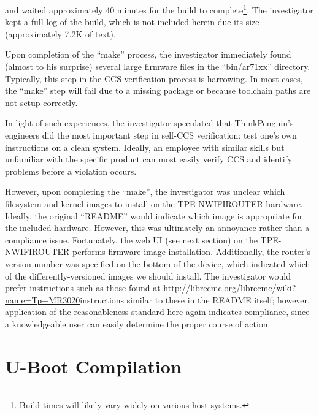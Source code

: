 and waited approximately 40 minutes for the build to complete\footnote{Build
  times will likely vary widely on various host systems.}.  The investigator
kept a
\href{https://gitorious.org/copyleft-org/tutorial/source/master:enforcement-case-studies_log-output/thinkpenguin_librecmc-complete.log}{full
  log of the build}, which is not included herein due its size (approximately
7.2K of text).
\label{thinkpenguin-main-build}

Upon completion of the ``make'' process, the investigator immediately found
(almost to his surprise) several large firmware files in the ``bin/ar71xx''
directory.  Typically, this step in the CCS verification process is
harrowing.  In most cases, the ``make'' step will fail due to a missing
package or because toolchain paths are not setup correctly.

In light of such experiences, the investigator speculated that ThinkPenguin's engineers did
the most important step in self-CCS verification: test one's own instructions
on a clean system.  Ideally, an employee with similar skills but
unfamiliar with the specific product can most easily verify CCS  and identify
problems before a violation occurs.


However, upon completing the ``make'', the investigator was unclear which
filesystem and kernel images to install on the TPE-NWIFIROUTER hardware.
Ideally, the original ``README'' would indicate which image is appropriate
for the included hardware.  However, this was ultimately an annoyance rather
than a compliance issue.  Fortunately,
the web UI (see next section) on the TPE-NWIFIROUTER performs firmware image
installation.  Additionally, the router's version number was specified on the
bottom of the device, which indicated which of the differently-versioned images
we should install.  The investigator would prefer instructions such as
those found at
\url{http://librecmc.org/librecmc/wiki?name=Tp+MR3020}{instructions similar
  to these} in the README itself; however, application of the reasonableness
standard here again indicates compliance, since a knowledgeable user can easily
determine the proper course of action.


\section{U-Boot Compilation}

